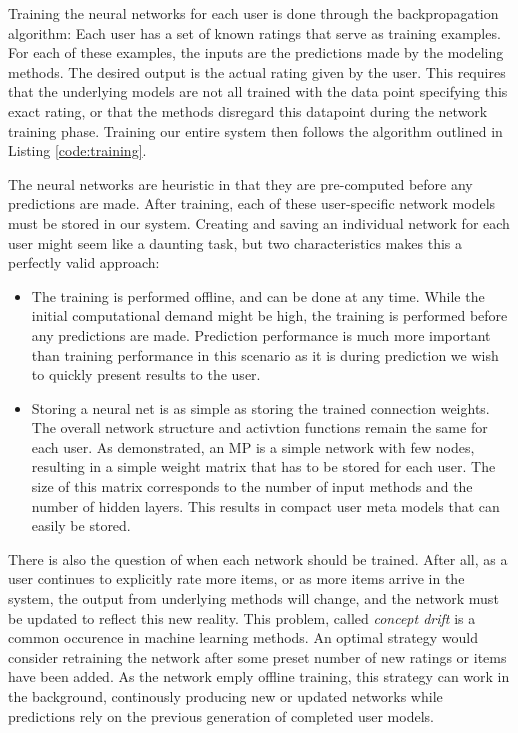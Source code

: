 Training the neural networks for each user is done through the backpropagation algorithm:
Each user has a set of known ratings that serve as training examples.
For each of these examples, the inputs are the predictions made by the modeling methods.
The desired output is the actual rating given by the user.
This requires that the underlying models are not all trained with the data point
specifying this exact rating, or that the methods disregard this datapoint during
the network training phase. Training our entire system then follows
the algorithm outlined in Listing \ref{code:training}.

\begin{figure*}
  
\end{figure*}

The neural networks are heuristic in that they are pre-computed before any predictions are made.
After training, each of these user-specific network models must be stored in our system.
Creating and saving an individual network for each user might seem like a daunting task,
but two characteristics makes this a perfectly valid approach:

\begin{itemize}
  \item 
    The training is performed offline, and can be done at any time.
    While the initial computational demand might be high,
    the training is performed before any predictions are made.
    Prediction performance is much more important than training performance
    in this scenario as it is during prediction we wish to quickly 
    present results to the user.
  \item
    Storing a neural net is as simple as storing the trained connection weights.
    The overall network structure and activtion functions remain the same for each user.
    As demonstrated, an MP is a simple network with few nodes, resulting
    in a simple weight matrix that has to be stored for each user.
    The size of this matrix corresponds to the number of input methods
    and the number of hidden layers.
    This results in compact user meta models that can easily be stored.
\end{itemize}

There is also the question of when each network should be trained.
After all, as a user continues to explicitly rate more items,
or as more items arrive in the system, the output from underlying methods
will change, and the network must be updated to reflect this new reality.
This problem, called \emph{concept drift} is a common occurence in machine learning methods.
An optimal strategy would consider retraining the network after some preset number
of new ratings or items have been added. As the network emply offline training,
this strategy can work in the background, continously producing new or updated networks
while predictions rely on the previous generation of completed user models.


